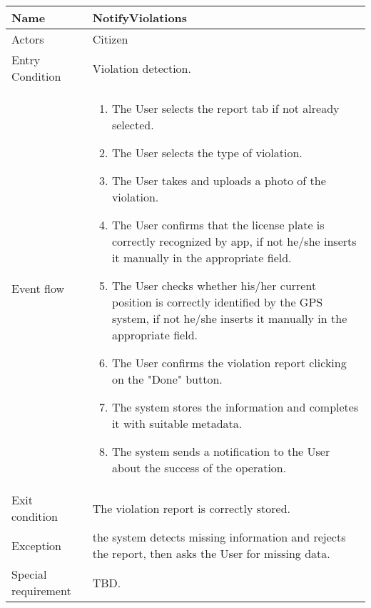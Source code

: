 \begin{tabular}{|p{3.7cm}|p{11cm}|}
\hline
Name & NotifyViolations\\
\hline
Actors & Citizen\\
\hline
Entry Condition & Violation detection.\\
\hline
Event flow & \begin{enumerate}
                \item The User selects the report tab if not already selected.
                \item The User selects the type of violation.
                \item The User takes and uploads a photo of the violation.
                \item The User confirms that the license plate is correctly recognized by app, if not he/she inserts it manually in the appropriate field.
                \item The User checks whether his/her current position is correctly identified by the GPS system, if not he/she inserts it manually in the appropriate field.
                \item The User confirms the violation report clicking on the "Done" button.
                \item The system stores the information and completes it with suitable metadata.
                \item The system sends a notification to the User about the success of the operation.
            \end{enumerate}\\
\hline
Exit condition & The violation report is correctly stored.\\
\hline
Exception & the system detects missing information and rejects the report, then asks the User for missing data.\\
\hline
Special requirement & TBD.\\
\hline
\end{tabular}

